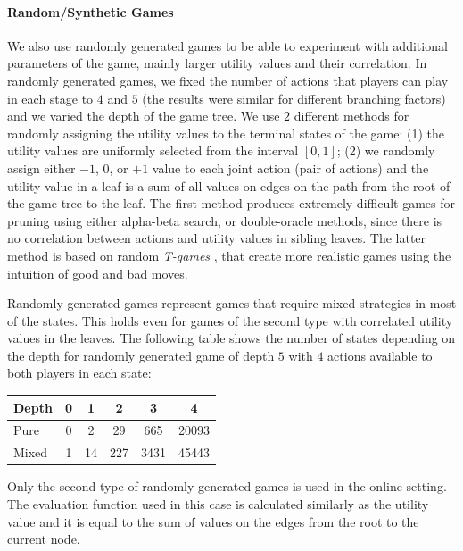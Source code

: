 \paragraph{\textbf{Random/Synthetic Games}}
We also use randomly generated games to be able to experiment with additional parameters of the game, mainly larger utility values and their correlation.
In randomly generated games, we fixed the number of actions that players can play in each stage to $4$ and $5$ (the results were similar for different branching factors) and we varied the depth of the game tree. 
We use $2$ different methods for randomly assigning the utility values to the terminal states of the game: 
(1) the utility values are uniformly selected from the interval $\left[0,1\right]$; 
(2) we randomly assign either $-1$, $0$, or $+1$ value to each joint action (pair of actions) and the utility value in a leaf is a sum of all values on edges on the path from the root of the game tree to the leaf. 
The first method produces extremely difficult games for pruning using either alpha-beta search, or double-oracle methods, since there is no correlation between actions and utility values in sibling leaves. 
The latter method is based on random \emph{T-games} \cite{smith1995}, that create more realistic games using the intuition of good and bad moves.

Randomly generated games represent games that require mixed strategies in most of the states. 
This holds even for games of the second type with correlated utility values in the leaves.
The following table shows the number of states depending on the depth for randomly generated game of depth $5$ with $4$ actions available to both players in each state:

\begin{table}[h!]
\centering
\small
\begin{tabular}{|l|c|c|c|c|c|}
\hline Depth & 0 & 1 & 2 & 3 & 4 \\
\hline Pure  & 0 & 2 & 29 & 665 & 20093 \\
\hline Mixed & 1 & 14 & 227 & 3431 & 45443 \\
\hline
\end{tabular}
\end{table}

Only the second type of randomly generated games is used in the online setting. 
The evaluation function used in this case is calculated similarly as the utility value and it is equal to the sum of values on the edges from the root to the current node.

